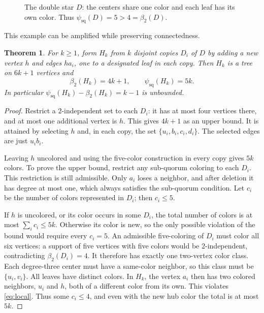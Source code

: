 \documentclass[11pt]{article}
\newtheorem{theorem}{Theorem}[section]
\theoremstyle{definition}
\theoremstyle{remark}
\newcommand{\psq}{\psi_{\mathrm{sq}}}
\newcommand{\bii}{\beta_2}
\begin{document}
\begin{figure}[ht]
\centering
{}
\caption{The double star $D$: the centers share one color and each leaf
has its own color. Thus $\psq(D)=5>4=\bii(D)$.}
\label{fig:double}
\end{figure}

This example can be amplified while preserving connectedness.

\begin{theorem}\label{thm:treegap}
For $k\ge1$, form $H_k$ from $k$ disjoint copies $D_i$ of $D$ by adding a
new vertex $h$ and edges $ha_i$, one to a designated leaf in each copy.
Then $H_k$ is a tree on $6k+1$ vertices and
\[
 \bii(H_k)=4k+1,\qquad \psq(H_k)=5k.
\]
In particular $\psq(H_k)-\bii(H_k)=k-1$ is unbounded.
\end{theorem}
\begin{proof}
Restrict a $2$-independent set to each $D_i$: it has at most four vertices
there, and at most one additional vertex is $h$. This gives $4k+1$ as
an upper bound. It is attained by selecting $h$ and, in each copy, the set
$\{u_i,b_i,c_i,d_i\}$. The selected edges are just $u_ib_i$.

Leaving $h$ uncolored and using the five-color construction in every
copy gives $5k$ colors. To prove the upper bound, restrict any sub-quorum
coloring to each $D_i$. This restriction is still admissible. Only $a_i$
loses a neighbor, and after deletion it has degree at most one, which
always satisfies the sub-quorum condition. Let $c_i$ be the number of
colors represented in $D_i$; then $c_i\le5$.

If $h$ is uncolored, or its color occurs in some $D_i$, the total number
of colors is at most $\sum_i c_i\le5k$. Otherwise its color is new, so
the only possible violation of the bound would require every $c_i=5$.
An admissible five-coloring of $D_i$ must color all six vertices: a support
of five vertices with five colors would be $2$-independent, contradicting
$\bii(D_i)=4$. It therefore has exactly one two-vertex color class.
Each degree-three center must have a same-color neighbor, so this class
must be $\{u_i,v_i\}$. All leaves have distinct colors. In $H_k$, the
vertex $a_i$ then has two colored neighbors, $u_i$ and $h$, both of a
different color from its own. This violates \eqref{eq:local}. Thus some
$c_i\le4$, and even with the new hub color the total is at most $5k$.
\end{proof}
\end{document}
